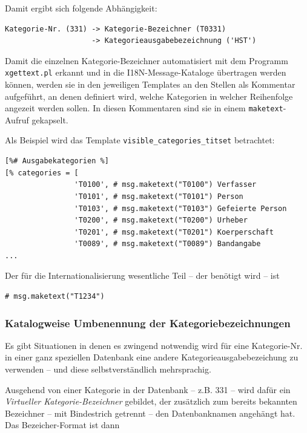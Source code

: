 \documentclass[11pt, twoside, a4paper, BCOR8mm, DIV12, bibtotoc,idxtotoc]{scrbook}
\begin{document}
Damit ergibt sich folgende Abhängigkeit:

\begin{verbatim}
Kategorie-Nr. (331) -> Kategorie-Bezeichner (T0331) 
                    -> Kategorieausgabebezeichnung ('HST')
\end{verbatim}

Damit die einzelnen Kategorie-Bezeichner automatisiert mit dem
Programm \texttt{xgettext.pl} erkannt und in die I18N-Message-Kataloge
übertragen werden können, werden sie in den jeweiligen Templates an
den Stellen als Kommentar aufgeführt, an denen definiert wird, welche
Kategorien in welcher Reihenfolge angezeit werden sollen. In diesen
Kommentaren sind sie in einem \texttt{maketext}-Aufruf gekapselt.

Als Beispiel wird das Template \texttt{visible\_categories\_titset}
betrachtet:

\begin{verbatim}
[%# Ausgabekategorien %]
[% categories = [
                'T0100', # msg.maketext("T0100") Verfasser
                'T0101', # msg.maketext("T0101") Person
                'T0103', # msg.maketext("T0103") Gefeierte Person
                'T0200', # msg.maketext("T0200") Urheber
                'T0201', # msg.maketext("T0201") Koerperschaft
                'T0089', # msg.maketext("T0089") Bandangabe  
...
\end{verbatim}

Der für die Internationalisierung wesentliche Teil -- der benötigt
wird -- ist

\begin{verbatim}
# msg.maketext("T1234")
\end{verbatim}

\subsubsection{Katalogweise Umbenennung der Kategoriebezeichnungen}

Es gibt Situationen in denen es zwingend notwendig wird für eine
Kategorie-Nr. in einer ganz speziellen Datenbank eine andere
Kategorieausgabe\-bezeichung zu verwenden -- und diese
selbst\-verständlich mehrsprachig.

Ausgehend von einer Kategorie in der Datenbank -- z.B. 331 -- wird
dafür ein \emph{Virtueller Kategorie-Bezeichner} gebildet, der
zusätzlich zum bereits bekannten Bezeichner -- mit Bindestrich
getrennt -- den Datenbanknamen angehängt hat. Das Bezeicher-Format ist
dann
\end{document}
